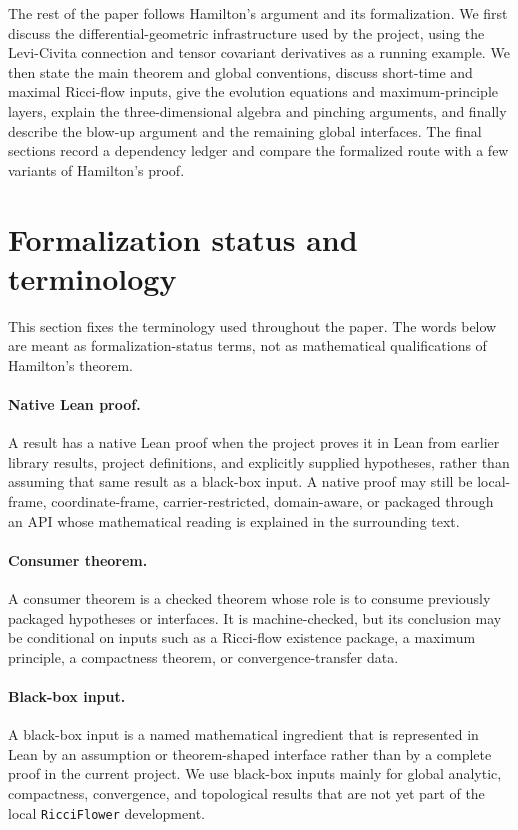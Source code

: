 \documentclass[11pt]{article}
\theoremstyle{plain}
\theoremstyle{definition}
\theoremstyle{remark}
\begin{document}
The rest of the paper follows Hamilton's argument and its formalization.  We
first discuss the differential-geometric infrastructure used by the project,
using the Levi-Civita connection and tensor covariant derivatives as a running
example.  We then state the main theorem and global conventions, discuss
short-time and maximal Ricci-flow inputs, give the evolution equations and
maximum-principle layers, explain the three-dimensional algebra and pinching
arguments, and finally describe the blow-up argument and the remaining global
interfaces.  The final sections record a dependency ledger and compare the
formalized route with a few variants of Hamilton's proof.

\section{Formalization status and terminology}

This section fixes the terminology used throughout the paper.  The words below
are meant as formalization-status terms, not as mathematical qualifications of
Hamilton's theorem.

\paragraph{Native Lean proof.}
A result has a native Lean proof when the project proves it in Lean from earlier
library results, project definitions, and explicitly supplied hypotheses,
rather than assuming that same result as a black-box input.  A native proof may still
be local-frame, coordinate-frame, carrier-restricted, domain-aware, or packaged
through an API whose mathematical reading is explained in the surrounding text.

\paragraph{Consumer theorem.}
A consumer theorem is a checked theorem whose role is to consume previously
packaged hypotheses or interfaces.  It is machine-checked, but its conclusion
may be conditional on inputs such as a Ricci-flow existence package, a maximum
principle, a compactness theorem, or convergence-transfer data.

\paragraph{Black-box input.}
A black-box input is a named mathematical ingredient that is represented in Lean
by an assumption or theorem-shaped interface rather than by a complete proof in
the current project.  We use black-box inputs mainly for global analytic,
compactness, convergence, and topological results that are not yet part of the
local \texttt{RicciFlower} development.
\end{document}
